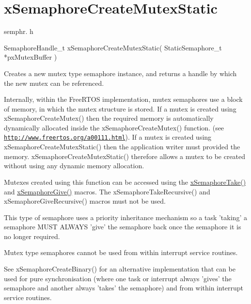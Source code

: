 \hypertarget{group__xSemaphoreCreateMutexStatic}{\section{x\-Semaphore\-Create\-Mutex\-Static}
\label{group__xSemaphoreCreateMutexStatic}
}
semphr. h 
\begin{DoxyPre}SemaphoreHandle\_t xSemaphoreCreateMutexStatic( StaticSemaphore\_t *pxMutexBuffer )\end{DoxyPre}


Creates a new mutex type semaphore instance, and returns a handle by which the new mutex can be referenced.

Internally, within the Free\-R\-T\-O\-S implementation, mutex semaphores use a block of memory, in which the mutex structure is stored. If a mutex is created using x\-Semaphore\-Create\-Mutex() then the required memory is automatically dynamically allocated inside the x\-Semaphore\-Create\-Mutex() function. (see \href{http://www.freertos.org/a00111.html}{\tt http\-://www.\-freertos.\-org/a00111.\-html}). If a mutex is created using x\-Semaphore\-Create\-Mutex\-Static() then the application writer must provided the memory. x\-Semaphore\-Create\-Mutex\-Static() therefore allows a mutex to be created without using any dynamic memory allocation.

Mutexes created using this function can be accessed using the \hyperlink{semphr_8h_af116e436d2a5ae5bd72dbade2b5ea930}{x\-Semaphore\-Take()} and \hyperlink{semphr_8h_aae55761cabfa9bf85c8f4430f78c0953}{x\-Semaphore\-Give()} macros. The x\-Semaphore\-Take\-Recursive() and x\-Semaphore\-Give\-Recursive() macros must not be used.

This type of semaphore uses a priority inheritance mechanism so a task 'taking' a semaphore M\-U\-S\-T A\-L\-W\-A\-Y\-S 'give' the semaphore back once the semaphore it is no longer required.

Mutex type semaphores cannot be used from within interrupt service routines.

See x\-Semaphore\-Create\-Binary() for an alternative implementation that can be used for pure synchronisation (where one task or interrupt always 'gives' the semaphore and another always 'takes' the semaphore) and from within interrupt service routines.


